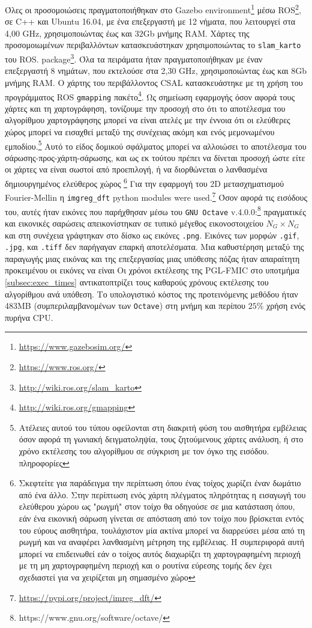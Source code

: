 Όλες οι προσομοιώσεις πραγματοποιήθηκαν στο Gazebo
environment\footnote{\url{https://www.gazebosim.org/}} μέσω
ROS\footnote{\url{https://www.ros.org/}}, σε C++ και Ubuntu 16.04, με ένα
επεξεργαστή με 12 νήματα, που λειτουργεί στα 4,00 GHz, χρησιμοποιώντας έως και $32$Gb μνήμης RAM. Χάρτες της
προσομοιωμένων περιβαλλόντων κατασκευάστηκαν χρησιμοποιώντας το \texttt{slam\_karto} του ROS.
package\footnote{\url{http://wiki.ros.org/slam\_karto}}. Όλα τα πειράματα ήταν
πραγματοποιήθηκαν με έναν επεξεργαστή 8 νημάτων, που εκτελούσε στα 2,30 GHz, χρησιμοποιώντας έως και
$8$Gb μνήμης RAM. Ο χάρτης του περιβάλλοντος CSAL κατασκευάστηκε με τη χρήση του προγράμματος ROS
\texttt{gmapping} πακέτο\footnote{\url{http://wiki.ros.org/gmapping}}. Ως
σημείωση εφαρμογής όσον αφορά τους χάρτες και τη χαρτογράφηση, τονίζουμε την προσοχή στο ότι
το αποτέλεσμα του αλγορίθμου χαρτογράφησης μπορεί να είναι ατελές με την έννοια ότι οι ελεύθερες
χώρος μπορεί να εισαχθεί μεταξύ της συνέχειας ακόμη και ενός μεμονωμένου
εμποδίου.\footnote{ Ατέλειες αυτού του τύπου οφείλονται στη διακριτή φύση
του αισθητήρα εμβέλειας όσον αφορά τη γωνιακή δειγματοληψία, τους ζητούμενους χάρτες
ανάλυση, ή στο χρόνο εκτέλεσης του αλγορίθμου σε σύγκριση με τον όγκο της εισόδου.
πληροφορίες} Αυτό το είδος δομικού σφάλματος μπορεί να αλλοιώσει το αποτέλεσμα του
σάρωσης-προς-χάρτη-σάρωσης, και ως εκ τούτου πρέπει να δίνεται προσοχή ώστε είτε
οι χάρτες να είναι σωστοί από προεπιλογή, ή να διορθώνεται ο λανθασμένα δημιουργημένος ελεύθερος χώρος
\footnote{ Σκεφτείτε για παράδειγμα την περίπτωση όπου ένας τοίχος χωρίζει έναν
δωμάτιο από ένα άλλο. Στην περίπτωση ενός χάρτη πλέγματος πληρότητας η εισαγωγή του
ελεύθερου χώρου ως "ρωγμή" στον τοίχο θα οδηγούσε σε μια κατάσταση όπου, εάν ένα
εικονική σάρωση γίνεται σε απόσταση από τον τοίχο που βρίσκεται εντός του εύρους
αισθητήρα, τουλάχιστον μία ακτίνα μπορεί να διαρρεύσει μέσα από τη ρωγμή και να αναφέρει
λανθασμένη μέτρηση της εμβέλειας.  Η συμπεριφορά αυτή μπορεί να επιδεινωθεί εάν ο τοίχος αυτός
διαχωρίζει τη χαρτογραφημένη περιοχή με τη μη χαρτογραφημένη περιοχή και ο
ρουτίνα εύρεσης τομής δεν έχει σχεδιαστεί για να χειρίζεται μη σημασμένο χώρο} Για την
εφαρμογή του 2D μετασχηματισμού Fourier-Mellin η \texttt{imgreg\_dft}
python modules were used.\footnote{\url{https://pypi.org/project/imreg\_dft/}}
Όσον αφορά τις εισόδους του, αυτές ήταν εικόνες που παρήχθησαν μέσω του \texttt{GNU Octave}
v.4.0.0:\footnote{https://www.gnu.org/software/octave/} πραγματικές και εικονικές σαρώσεις
απεικονίστηκαν σε τυπικό μέγεθος εικονοστοιχείου $N_G \times N_G$ και στη συνέχεια γράφτηκαν στο δίσκο
ως εικόνες \texttt{.png}. Εικόνες των μορφών \texttt{.gif}, \texttt{.jpg}, και
\texttt{.tiff} δεν παρήγαγαν επαρκή αποτελέσματα. Μια καθυστέρηση μεταξύ της παραγωγής μιας
εικόνας και της επεξεργασίας μιας υπόθεσης πόζας ήταν απαραίτητη προκειμένου οι εικόνες να είναι
Οι χρόνοι εκτέλεσης της PGL-FMIC στο υποτμήμα
\ref{subsec:exec_times} αντικατοπτρίζει τους καθαρούς χρόνους εκτέλεσης του αλγορίθμου ανά
υπόθεση. Το υπολογιστικό κόστος της προτεινόμενης μεθόδου ήταν 483MB (συμπεριλαμβανομένων των
\texttt{Octave}) στη μνήμη και περίπου $25\%$ χρήση ενός πυρήνα CPU.


